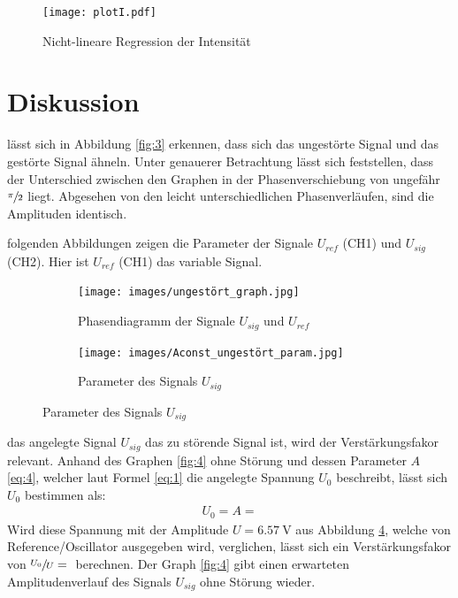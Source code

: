 \begin{figure}[H]
    \centering
    \texttt{[image: plotI.pdf]}
    \caption{Nicht-lineare Regression der Intensität}
    \label{fig:6}
\end{figure}


\section{Diskussion} \label{sec:6}

\justifying lässt sich in Abbildung \ref{fig:3} erkennen, dass sich das ungestörte Signal und das gestörte Signal ähneln. Unter 
genauerer Betrachtung lässt sich feststellen, dass der Unterschied zwischen den Graphen in der Phasenverschiebung von ungefähr $\sfrac{\pi}{2}$
liegt. Abgesehen von den leicht unterschiedlichen Phasenverläufen, sind die Amplituden identisch. 


\justifying folgenden Abbildungen zeigen die Parameter der Signale $U_{ref}$ (CH1) und $U_{sig}$ (CH2). Hier ist $U_{ref}$ (CH1)
das variable Signal.

\begin{figure}[H] 
\caption{Funktionalität des Gleichrichters}
\label{fig:7}
    \begin{subfigure}{0.495\linewidth}
        \centering
        \texttt{[image: images/ungestört\_graph.jpg]}
        \caption{Phasendiagramm der Signale $U_{sig}$ und $U_{ref}$}
        \label{fig:7a}
    \end{subfigure}
    \begin{subfigure}{0.495\linewidth}
        \centering
        \texttt{[image: images/Aconst\_ungestört\_param.jpg]}
        \caption{Parameter des Signals $U_{sig}$}
        \label{fig:7b}
    \end{subfigure}
\end{figure}

\justifying das angelegte Signal $U_{sig}$ das zu störende Signal ist, wird der Verstärkungsfakor relevant.
Anhand des Graphen \ref{fig:4} ohne Störung und dessen Parameter $A$ \eqref{eq:4}, welcher laut Formel \eqref{eq:1} die angelegte Spannung $U_0$ 
beschreibt, lässt sich $U_0$ bestimmen als:
\begin{align}
    U_0 = A = \text{}
\end{align}
Wird diese Spannung mit der Amplitude $U = \SI{6.57}{\volt}$ aus Abbildung \ref{fig:7b}, welche von Reference/Oscillator ausgegeben wird, verglichen, 
lässt sich ein Verstärkungsfakor von $\sfrac{U_0}{U} = \text{}$ berechnen. Der Graph \ref{fig:4} gibt einen erwarteten Amplitudenverlauf 
des Signals $U_{sig}$ ohne Störung wieder. 


